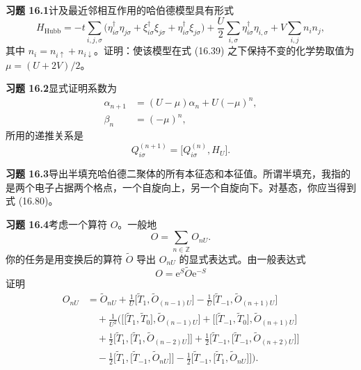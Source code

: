 \textbf{习题 16.1}\quad 计及最近邻相互作用的哈伯德模型具有形式
\begin{equation*}
H_{\mathrm{Hubb}}=-t\sum_{i,j,\sigma}\big(\eta_{i\sigma}^{\dagger}\eta_{j\sigma}+\xi_{i\sigma}^{\dagger}\xi_{j\sigma}+\eta_{i\sigma}^{\dagger}\xi_{j\sigma}\big)+\frac{U}{2}\sum_{i,\sigma}\eta_{i\sigma}^{\dagger}\eta_{i,\sigma}+V\sum_{i,j}n_{i}n_{j},\tag{16.139}
\end{equation*}
其中 $n_{i}=n_{i\uparrow}+n_{i\downarrow}$。证明：使该模型在式 (16.39) 之下保持不变的化学势取值为 $\mu=(U+2V)/2$。

\textbf{习题 16.2}\quad 显式证明系数为
\begin{align*}
\alpha_{n+1}&=(U-\mu)\alpha_{n}+U(-\mu)^{n},\\
\beta_{n}&=(-\mu)^{n},\tag{16.140}
\end{align*}
所用的递推关系是
\begin{equation*}
Q_{i\sigma}^{(n+1)}=\big[Q_{i\sigma}^{(n)},H_{U}\big].\tag{16.141}
\end{equation*}

\textbf{习题 16.3}\quad 导出半填充哈伯德二聚体的所有本征态和本征值。所谓半填充，我指的是两个电子占据两个格点，一个自旋向上，另一个自旋向下。对基态，你应当得到式 (16.80)。

\textbf{习题 16.4}\quad 考虑一个算符 $O$。一般地
\begin{equation*}
O=\sum_{n\in\mathbb{Z}}O_{nU}.\tag{16.142}
\end{equation*}
你的任务是用变换后的算符 $\tilde{O}$ 导出 $O_{nU}$ 的显式表达式。由一般表达式
\begin{equation*}
O=\mathrm{e}^{S}\tilde{O}\mathrm{e}^{-S}\tag{16.143}
\end{equation*}
证明
\begin{align*}
O_{nU}&=\tilde{O}_{nU}+\frac{1}{U}\big[\tilde{T}_{1},\tilde{O}_{(n-1)U}\big]-\frac{1}{U}\big[\tilde{T}_{-1},\tilde{O}_{(n+1)U}\big]\\
&\quad+\frac{1}{U^{2}}\Big(\big[\big[\tilde{T}_{1},\tilde{T}_{0}\big],\tilde{O}_{(n-1)U}\big]+\big[\big[\tilde{T}_{-1},\tilde{T}_{0}\big],\tilde{O}_{(n+1)U}\big]\\
&\quad+\frac{1}{2}\big[\tilde{T}_{1},\big[\tilde{T}_{1},\tilde{O}_{(n-2)U}\big]\big]+\frac{1}{2}\big[\tilde{T}_{-1},\big[\tilde{T}_{-1},\tilde{O}_{(n+2)U}\big]\big]\\
&\quad-\frac{1}{2}\big[\tilde{T}_{1},\big[\tilde{T}_{-1},\tilde{O}_{nU}\big]\big]-\frac{1}{2}\big[\tilde{T}_{-1},\big[\tilde{T}_{1},\tilde{O}_{nU}\big]\big]\Big).\tag{16.144}
\end{align*}

